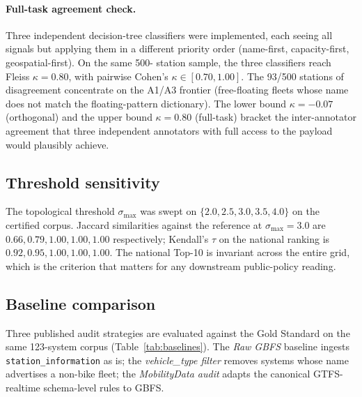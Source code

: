 \documentclass[11pt,a4paper]{article}
\begin{document}
\paragraph{Full-task agreement check.}
Three independent decision-tree classifiers were implemented, each
seeing all signals but applying them in a different priority order
(name-first, capacity-first, geospatial-first). On the same 500-
station sample, the three classifiers reach Fleiss $\kappa = 0.80$,
with pairwise Cohen's $\kappa \in [0.70, 1.00]$. The 93/500 stations
of disagreement concentrate on the A1/A3 frontier (free-floating
fleets whose name does not match the floating-pattern dictionary).
The lower bound $\kappa = -0.07$ (orthogonal) and the upper bound
$\kappa = 0.80$ (full-task) bracket the inter-annotator agreement
that three independent annotators with full access to the payload
would plausibly achieve.

\subsection{Threshold sensitivity}
The topological threshold $\sigma_{\max}$ was swept on
$\{2.0, 2.5, 3.0, 3.5, 4.0\}$ on the certified corpus. Jaccard
similarities against the reference at $\sigma_{\max} = 3.0$ are
$0.66, 0.79, 1.00, 1.00, 1.00$ respectively; Kendall's $\tau$ on the
national ranking is $0.92, 0.95, 1.00, 1.00, 1.00$. The national
Top-10 is invariant across the entire grid, which is the criterion
that matters for any downstream public-policy reading.

\subsection{Baseline comparison}
Three published audit strategies are evaluated against the Gold
Standard on the same 123-system corpus
(Table~\ref{tab:baselines}). The \emph{Raw GBFS} baseline ingests
\texttt{station\_information} as is; the \emph{vehicle\_type filter}
removes systems whose name advertises a non-bike fleet; the
\emph{MobilityData audit} adapts the canonical GTFS-realtime
schema-level rules to GBFS.
\end{document}
